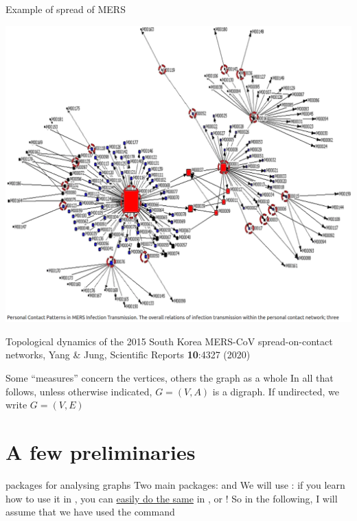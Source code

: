 \documentclass[aspectratio=43]{beamer}
\begin{document}
\begin{frame}{Example of spread of MERS}
	\begin{minipage}{0.8\textwidth}
		\hspace*{-\beamerleftmargin}
		\includegraphics[height=\paperheight]{FIGS_slides/YangJung2015SouthKoreaMERS}
	\end{minipage}
	\begin{minipage}{0.18\textwidth}
	\tiny
	Topological dynamics of the 2015 South Korea MERS-CoV spread-on-contact networks, Yang \& Jung, Scientific Reports \textbf{10}:4327 (2020)
	\end{minipage}
\end{frame}


\begin{frame}
	Some ``measures'' concern the vertices, others the graph as a whole
	\vfill
	In all that follows, unless otherwise indicated, $G=(V,A)$ is a digraph. If undirected, we write $G=(V,E)$
\end{frame}


\section{A few  preliminaries}
\begin{frame}{ packages for analysing graphs}
	Two main packages: \href{https://cran.r-project.org/web/packages/network/index.html}{} and \href{https://r.igraph.org/}{}
	\vfill
	We will use : if you learn how to use it in , you can \href{https://igraph.org/index.html}{easily do the same} in ,  or  !
	\vfill
	So in the following, I will assume that we have used the command 
\end{frame}
\end{document}
